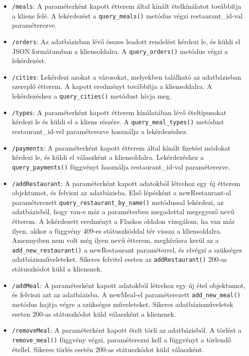 \begin{itemize}
\item \texttt{/meals}:
A paraméterként kapott étterem által kínált ételkínálatot továbbítja a kliens felé. A lekérdezést a \texttt{query\_meals()} metódus végzi restaurant\_id-val paraméterezve.
\item \texttt{/orders}:
Az adatbázisban lévő összes leadott rendelést kérdezi le, és küldi el JSON formátumban a kliensoldalra. A \texttt{query\_orders()} metódus végzi a lekérdezést.
\item \texttt{/cities}:
Lekérdezi azokat a városokat, melyekben található az adatbázisban szereplő étterem. A kapott eredményt továbbítja a kliensoldalra. A lekérdezéshez a \texttt{query\_cities()} metódust hívja meg.
\item \texttt{/types}:
A paraméterként kapott étterem kínálatában lévő ételtípusokat kérdezi le és küldi el a kliens részére. A \texttt{query\_meal\_types()} metódust restaurant\_id-vel paraméterezve használja a lekérdezéshez.
\item \texttt{/payments}:
A paraméterként kapott étterem által kínált fizetési módokat kérdezi le, és küldi el válaszként a kliensoldalra. Lekérdezéshez a \texttt{query\_payments()} függvényt használja restaurant\_id-val paraméterezve.
\item \texttt{/addRestaurant}:
A paraméterként kapott adatokból létrehoz egy új étterem objektumot, és felviszi az adatbázisba. Első lépésként a newRestaurant-al paraméterezett \texttt{query\_restaurant\_by\_name()} metódussal lekérdezi, az adatbázisból, hogy van-e már a paraméterben megadottal megegyező nevű étterem. A lekérdezett eredményt a Flaskos oldalon vizsgálom, ha van már ilyen, akkor a függvény 409-es státuszkóddal tér vissza a kliensoldalra. Amennyiben nem volt még ilyen nevű étterem, meghívásra kerül az a \texttt{add\_new\_restaurant()} a newRestaurant paraméterrel, és elvégzi a szükséges adatbázisműveleteket. Sikeres felvitel eseten az \texttt{addRestaurant()} 200-as státuszkódot küld a kliensnek.
\item \texttt{/addMeal}:
A paraméterként kapott adatokból létrehoz egy új étel objektumot, és felviszi azt az adatbázisba. A newMeal-el paraméterezett \texttt{add\_new\_meal()} metódus hajtja végre a szükséges műveleteket. Sikeres adatbázisműveletek eseten 200-as státuszkódot küld válaszként a kliensnek.
\item \texttt{/removeMeal}:
A paraméterként kapott ételt törli az adatbázisból. A törlést a \texttt{remove\_meal()} függvény végzi, paraméterezni kell a függvényt a törlendő étellel. Sikeres törlés esetén 200-as státuszkódot küld válaszként.

\end{itemize}
